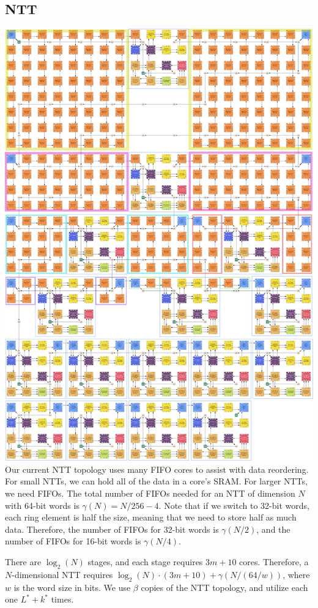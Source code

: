 \documentclass[../../fheimpl.tex]{subfiles}
\begin{document}
\subsection{NTT}
\includegraphics[width=\textwidth,height=\textheight,keepaspectratio]{graphics/ntt.png}
Our current NTT topology uses many FIFO cores to assist with data reordering. For small NTTs, we can hold all of the data in a core's SRAM. For larger NTTs, we need FIFOs. The total number of FIFOs needed for an NTT of dimension $N$ with 64-bit words is $\gamma(N)=N/256-4$. Note that if we switch to 32-bit words, each ring element is half the size, meaning that we need to store half as much data. Therefore, the number of FIFOs for 32-bit words is $\gamma(N/2)$, and the number of FIFOs for 16-bit words is $\gamma(N/4)$.

There are $\log_2(N)$ stages, and each stage requires $3m+10$ cores. Therefore, a $N$-dimensional NTT requires $\log_2(N)\cdot(3m+10)+\gamma(N/(64/w))$, where $w$ is the word size in bits. We use $\beta$ copies of the NTT topology, and utilize each one $L^*+k^*$ times.
\end{document}
